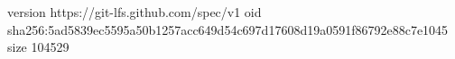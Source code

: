 version https://git-lfs.github.com/spec/v1
oid sha256:5ad5839ec5595a50b1257acc649d54c697d17608d19a0591f86792e88c7e1045
size 104529
